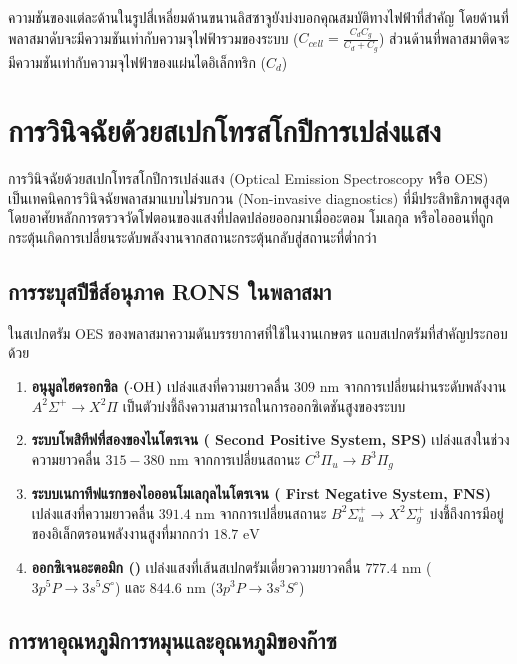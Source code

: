 ความชันของแต่ละด้านในรูปสี่เหลี่ยมด้านขนานลิสซาจูยังบ่งบอกคุณสมบัติทางไฟฟ้าที่สำคัญ โดยด้านที่พลาสมาดับจะมีความชันเท่ากับความจุไฟฟ้ารวมของระบบ ($C_{cell} = \frac{C_d C_g}{C_d + C_g}$) ส่วนด้านที่พลาสมาติดจะมีความชันเท่ากับความจุไฟฟ้าของแผ่นไดอิเล็กทริก ($C_d$)

\section{การวินิจฉัยด้วยสเปกโทรสโกปีการเปล่งแสง}

การวินิจฉัยด้วยสเปกโทรสโกปีการเปล่งแสง (Optical Emission Spectroscopy หรือ OES) เป็นเทคนิคการวินิจฉัยพลาสมาแบบไม่รบกวน (Non-invasive diagnostics) ที่มีประสิทธิภาพสูงสุด โดยอาศัยหลักการตรวจวัดโฟตอนของแสงที่ปลดปล่อยออกมาเมื่ออะตอม โมเลกุล หรือไอออนที่ถูกกระตุ้นเกิดการเปลี่ยนระดับพลังงานจากสถานะกระตุ้นกลับสู่สถานะที่ต่ำกว่า

\subsection{การระบุสปีชีส์อนุภาค RONS ในพลาสมา}

ในสเปกตรัม OES ของพลาสมาความดันบรรยากาศที่ใช้ในงานเกษตร แถบสเปกตรัมที่สำคัญประกอบด้วย
\begin{enumerate}
    \item \textbf{อนุมูลไฮดรอกซิล ($\cdot\ce{OH}$)} เปล่งแสงที่ความยาวคลื่น $309\text{ nm}$ จากการเปลี่ยนผ่านระดับพลังงาน $A^2\Sigma^+ \rightarrow X^2\Pi$ เป็นตัวบ่งชี้ถึงความสามารถในการออกซิเดชันสูงของระบบ
    \item \textbf{ระบบโพสิทีฟที่สองของไนโตรเจน ( Second Positive System, SPS)} เปล่งแสงในช่วงความยาวคลื่น $315 - 380\text{ nm}$ จากการเปลี่ยนสถานะ $C^3\Pi_u \rightarrow B^3\Pi_g$
    \item \textbf{ระบบเนกาทีฟแรกของไอออนโมเลกุลไนโตรเจน ( First Negative System, FNS)} เปล่งแสงที่ความยาวคลื่น $391.4\text{ nm}$ จากการเปลี่ยนสถานะ $B^2\Sigma_u^+ \rightarrow X^2\Sigma_g^+$ บ่งชี้ถึงการมีอยู่ของอิเล็กตรอนพลังงานสูงที่มากกว่า $18.7\text{ eV}$
    \item \textbf{ออกซิเจนอะตอมิก ()} เปล่งแสงที่เส้นสเปกตรัมเดี่ยวความยาวคลื่น $777.4\text{ nm}$ ($3p^5P \rightarrow 3s^5S^\circ$) และ $844.6\text{ nm}$ ($3p^3P \rightarrow 3s^3S^\circ$)
\end{enumerate}

\subsection{การหาอุณหภูมิการหมุนและอุณหภูมิของก๊าซ}

